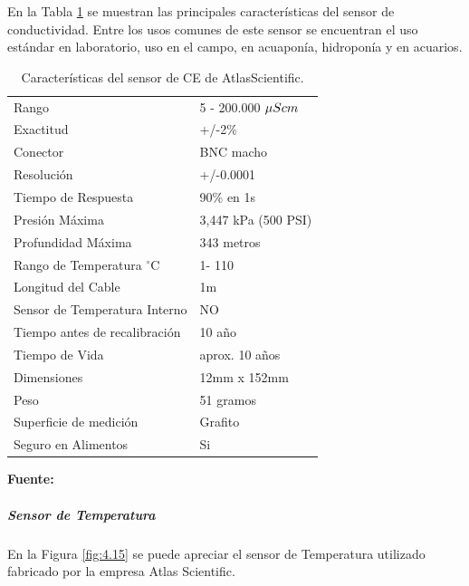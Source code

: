 En la Tabla \ref{tab:caract_ce} se muestran las principales características del sensor de conductividad.
Entre los usos comunes de este sensor se encuentran el uso estándar en laboratorio, uso en el campo, en acuaponía, hidroponía y en acuarios.
\begin{table}[H]
\protect\caption[Características del sensor de CE de AtlasScientific]{Características del sensor de CE de AtlasScientific.}
\label{tab:caract_ce}
\begin{center}
\begin{tabular}{l l}

\hline

Rango    &  5 - 200.000 $\mu S\/cm$\\
Exactitud      &  +/-2\% \\
Conector &  BNC macho\\
Resolución   &  +/-0.0001\\
Tiempo de Respuesta   &  90\% en 1s\\
Presión Máxima    &  3,447 kPa (500 PSI) \\
Profundidad Máxima	& 343 metros\\
Rango de Temperatura $^{\circ}$C	& 1- 110\\
Longitud del Cable	& 1m\\
Sensor de Temperatura Interno	& NO\\
Tiempo antes de recalibración	& 10 año\\
Tiempo de Vida	& aprox. 10 años\\
Dimensiones	& 12mm x 152mm\\
Peso	& 51 gramos\\
Superficie de medición	& Grafito\\
Seguro en Alimentos	& Si\\
\hline
\end{tabular}
\vspace{5mm}
\newline
\hfill \textbf{Fuente:} \cite{atlasce}
\end{center}
\end{table}

\subparagraph{Sensor de Temperatura}
En la Figura \ref{fig:4.15}  se puede apreciar el sensor de Temperatura utilizado fabricado por la empresa Atlas Scientific.


